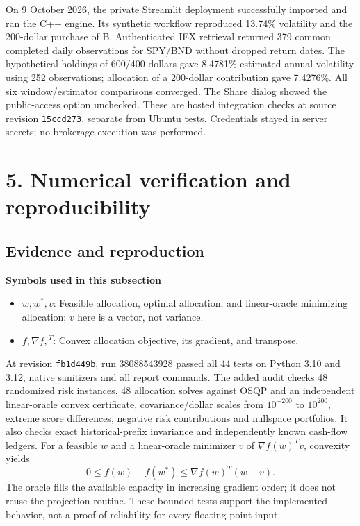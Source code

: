 \documentclass[
  american,
  11pt,
]{article}
\begin{document}
On 9 October 2026, the private Streamlit deployment successfully imported
and ran the C++ engine. Its synthetic workflow reproduced 13.74\% volatility
and the 200-dollar purchase of B. Authenticated IEX retrieval returned 379
common completed daily observations for SPY/BND without dropped return dates.
The hypothetical holdings of 600/400 dollars gave 8.4781\% estimated annual
volatility using 252 observations; allocation of a 200-dollar contribution
gave 7.4276\%. All six window/estimator comparisons converged. The Share
dialog showed the public-access option unchecked. These are hosted integration
checks at source revision \texttt{15ccd273}, separate from Ubuntu tests.
Credentials stayed in server secrets; no brokerage execution was performed.

\section{5. Numerical verification and
reproducibility}\label{numerical-verification-and-reproducibility}

\subsection{Evidence and reproduction}\label{evidence-and-reproduction}

\textbf{Symbols used in this subsection}
\begin{itemize}
\item \(w,w^*,v\): Feasible allocation, optimal allocation, and linear-oracle minimizing allocation; $v$ here is a vector, not variance.
\item \(f,\nabla f,{}^T\): Convex allocation objective, its gradient, and transpose.
\end{itemize}


At revision \texttt{fb1d449b},
\href{https://github.com/eshangark/portfolio-risk-engine/actions/runs/38088543928}{run 38088543928}
passed all 44 tests on Python 3.10 and 3.12, native sanitizers and all report
commands. The added audit checks 48 randomized risk instances, 48 allocation
solves against OSQP and an independent linear-oracle convex certificate,
covariance/dollar scales from $10^{-200}$ to $10^{200}$, extreme score differences,
negative risk contributions and nullspace portfolios. It also checks exact
historical-prefix invariance and independently known cash-flow ledgers.
For a feasible $w$ and a linear-oracle minimizer $v$ of $\nabla f(w)^Tv$,
convexity yields
\[0\le f(w)-f(w^*)\le \nabla f(w)^T(w-v).\]
The oracle fills the available capacity in increasing gradient order; it
does not reuse the projection routine. These bounded tests support the
implemented behavior, not a proof of reliability for every floating-point input.
\end{document}
